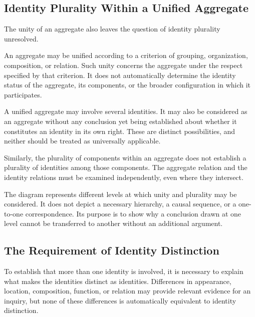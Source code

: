 \subsection{Identity Plurality Within a Unified Aggregate}

The unity of an aggregate also leaves the question of
identity plurality unresolved.

An aggregate may be unified according to a criterion
of grouping, organization, composition, or relation.
Such unity concerns the aggregate under the respect
specified by that criterion. It does not automatically
determine the identity status of the aggregate, its
components, or the broader configuration in which it
participates.

A unified aggregate may involve several identities.
It may also be considered as an aggregate without any
conclusion yet being established about whether it
constitutes an identity in its own right. These are
distinct possibilities, and neither should be treated
as universally applicable.

Similarly, the plurality of components within an aggregate
does not establish a plurality of identities among those
components. The aggregate relation and the identity
relations must be examined independently, even where
they intersect.



The diagram represents different levels at which unity
and plurality may be considered. It does not depict a
necessary hierarchy, a causal sequence, or a one-to-one
correspondence. Its purpose is to show why a conclusion
drawn at one level cannot be transferred to another
without an additional argument.

\subsection{The Requirement of Identity Distinction}

To establish that more than one identity is involved,
it is necessary to explain what makes the identities
distinct as identities. Differences in appearance,
location, composition, function, or relation may provide
relevant evidence for an inquiry, but none of these
differences is automatically equivalent to identity
distinction.

